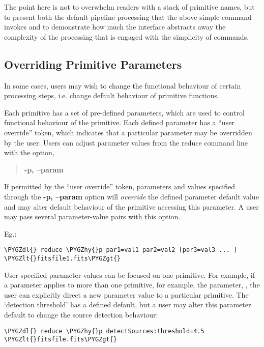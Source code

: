 \documentclass[letterpaper,10pt,english]{sphinxmanual}
\def\PYGZlt{\char`\<}
\def\PYGZgt{\char`\>}
\def\PYGZdl{\char`\$}
\def\PYGZhy{\char`\-}
\begin{document}
The point here is not to overwhelm readers with a stack of primitive names, but
to present both the default pipeline processing that the above simple 
command invokes and to demonstrate how much the  interface abstracts
away the complexity of the processing that is engaged with the simplicity of
commands.


\subsection{Overriding Primitive Parameters}
\label{interfaces:userpars}\label{interfaces:overriding-primitive-parameters}
In some cases, users may wish to change the functional behaviour of certain
processing steps, i.e. change default behaviour of primitive
functions.

Each primitive has a set of pre-defined parameters, which are used to control
functional behaviour of the primitive. Each defined parameter has a ``user
override'' token, which indicates that a particular parameter may be overridden
by the user. Users can adjust parameter values from the reduce command line with
the option,
\begin{quote}

\textbf{-p, --param}
\end{quote}

If permitted by the ``user override'' token, parameters and values specified
through the \textbf{-p, --param} option will \emph{override} the defined
parameter default value and may alter default behaviour of the primitive
accessing this parameter. A user may pass several parameter-value pairs with
this option.

Eg.:

\begin{Verbatim}[commandchars=\\\{\}]
\PYGZdl{} reduce \PYGZhy{}p par1=val1 par2=val2 [par3=val3 ... ] \PYGZlt{}fitsfile1.fits\PYGZgt{}
\end{Verbatim}

User-specified parameter values can be focused on one primitive. For example,
if a parameter applies to more than one primitive, for example, the parameter,
, the user can explicitly direct a new parameter value to a
particular primitive. The `detection threshold' has a defined default, but a
user may alter this parameter default to change the source detection behaviour:

\begin{Verbatim}[commandchars=\\\{\}]
\PYGZdl{} reduce \PYGZhy{}p detectSources:threshold=4.5 \PYGZlt{}fitsfile.fits\PYGZgt{}
\end{Verbatim}
\end{document}
